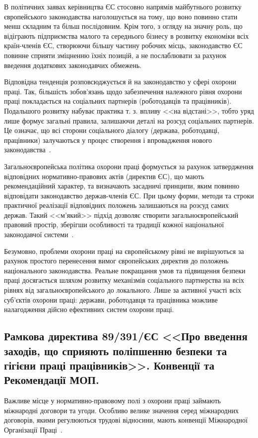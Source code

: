 В політичних заявах керівництва ЄС стосовно напрямів майбутнього розвитку європейського законодавства наголошується на тому, що воно повинно стати менш складним та більш послідовним. 
Крім того, з огляду на значну роль, що відіграють підприємства малого та середнього бізнесу в розвитку економіки всіх країн-членів ЄС, створюючи більшу частину робочих місць, законодавство ЄС повинне сприяти зміцненню їхніх позицій, а не послаблювати за рахунок введення додаткових законодавчих обмежень. 

Відповідна тенденція розповсюджується й на законодавство у сфері охорони праці. 
Так, більшість зобов’язань щодо забезпечення належного рівня охорони праці покладається на соціальних партнерів (роботодавців та працівників).
Подальшого розвитку набуває практика т. з. впливу <<на відстані>>, тобто уряд лише формує загальні правила, залишаючи деталі на розсуд соціальних партнерів. 
Це означає, що всі сторони соціального діалогу (держава, роботодавці, працівники) залучаються у процес створення і впровадження нового законодавства~\cite{Shashula2015}. 

Загальноєвропейська політика охорони праці формується за рахунок затвердження відповідних нормативно-правових актів (директив ЄС), що мають рекомендаційний характер, та визначають засадничі принципи, яким повинно відповідати законодавство держав-членів ЄС. 
При цьому форми, методи та строки практичної реалізації відповідних положень залишаються на розсуд самих держав.
Такий <<м’який>> підхід дозволяє створити загальноєвропейський правовий простір, зберігши особливості та традиції кожної національної законодавчої системи~\cite{Shashula2015}.

Безумовно, проблеми охорони праці на європейському рівні не вирішуються за рахунок простого перенесення вимог європейських директив до положень національного законодавства. 
Реальне покращання умов та підвищення безпеки праці досягається шляхом розвитку механізмів соціального партнерства на всіх рівнях від загальноєвропейського до локального. 
Лише за активної участі всіх суб’єктів охорони праці: держави, роботодавця та працівника можливе налагодження дійсно ефективних систем охорони праці. 

\subsection*{Рамкова директива 89/391/ЄС <<Про введення заходів, що сприяють поліпшенню безпеки та гігієни праці працівників>>. Конвенції та Рекомендації МОП.}
Важливе місце у нормативно-правовому полі з охорони праці займають міжнародні договори та угоди.
Особливо велике значення серед міжнародних договорів, якими регулюються трудові відносини, мають конвенції Міжнародної Організації Праці~\cite{LectureKPI}.

